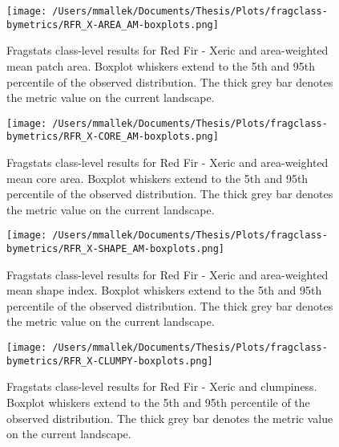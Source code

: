 \begin{figure}[!htbp]
\centering
    \texttt{[image: /Users/mmallek/Documents/Thesis/Plots/fragclass-bymetrics/RFR\_X-AREA\_AM-boxplots.png]}
  \caption{Fragstats class-level results for Red Fir - Xeric and area-weighted mean patch area. Boxplot whiskers extend to the 5th and 95th percentile of the observed distribution. The thick grey bar denotes the metric value on the current landscape.}
  \label{fig:rfrx_areaam}
\end{figure}


\begin{figure}[!htbp]
\centering
    \texttt{[image: /Users/mmallek/Documents/Thesis/Plots/fragclass-bymetrics/RFR\_X-CORE\_AM-boxplots.png]}
  \caption{Fragstats class-level results for Red Fir - Xeric and area-weighted mean core area. Boxplot whiskers extend to the 5th and 95th percentile of the observed distribution. The thick grey bar denotes the metric value on the current landscape.}
  \label{fig:rfrx_coream}
\end{figure}


\begin{figure}[!htbp]
\centering
    \texttt{[image: /Users/mmallek/Documents/Thesis/Plots/fragclass-bymetrics/RFR\_X-SHAPE\_AM-boxplots.png]}
  \caption{Fragstats class-level results for Red Fir - Xeric and area-weighted mean shape index. Boxplot whiskers extend to the 5th and 95th percentile of the observed distribution. The thick grey bar denotes the metric value on the current landscape.}
  \label{fig:rfrx_shapeam}
\end{figure}


\begin{figure}[!htbp]
\centering
    \texttt{[image: /Users/mmallek/Documents/Thesis/Plots/fragclass-bymetrics/RFR\_X-CLUMPY-boxplots.png]}
  \caption{Fragstats class-level results for Red Fir - Xeric and clumpiness. Boxplot whiskers extend to the 5th and 95th percentile of the observed distribution. The thick grey bar denotes the metric value on the current landscape.}
  \label{fig:rfrx_clumpy}
\end{figure}




